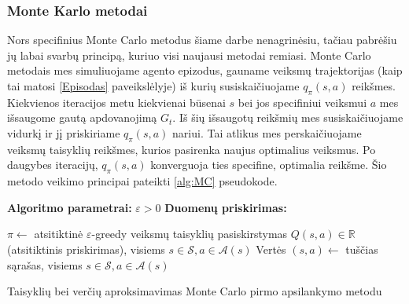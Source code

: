 \documentclass[a4paper, 12pt]{article}
\begin{document}
\clearpage
\subsubsection{Monte Karlo metodai}

Nors specifinius Monte Carlo metodus šiame darbe nenagrinėsiu, tačiau pabrėšiu jų labai svarbų principą, kuriuo visi naujausi metodai remiasi. Monte Carlo metodais mes simuliuojame agento epizodus, gauname veiksmų trajektorijas (kaip tai matosi \ref{Episodas} paveikslėlyje) iš kurių susiskaičiuojame $q_{\pi}(s, a)$ reikšmes. Kiekvienos iteracijos metu kiekvienai būsenai $s$ bei jos specifiniui veiksmui $a$ mes išsaugome gautą apdovanojimą $G_t$. Iš šių išsaugotų reikšmių mes susiskaičiuojame vidurkį ir jį priskiriame $q_{\pi}(s, a)$ nariui. Tai atlikus mes perskaičiuojame veiksmų taisyklių reikšmes, kurios pasirenka naujus optimalius veiksmus. Po daugybes iteracijų, $q_{\pi}(s, a)$ konverguoja ties specifine, optimalia reikšme. Šio metodo veikimo principai pateikti \ref{alg:MC} pseudokode.

\begin{algorithm}[H]
 \label{alg:MC}
\SetAlgoLined
\DontPrintSemicolon
\textbf{Algoritmo parametrai:}\; 
$\varepsilon>0$\;
\textbf{Duomenų priskirimas:}\;

	$\pi \leftarrow$ atsitiktinė $\varepsilon$-greedy veiksmų taisyklių pasiskirstymas\;
	$Q(s, a) \in \mathbb{R}$ (atsitiktinis priskirimas), visiems $s \in \mathcal{S}, a \in \mathcal{A}(s)$\;
	Vertės $(s, a) \leftarrow$ tuščias sąrašas, visiems $s \in \mathcal{S}, a \in \mathcal{A}(s)$\;
	


\caption{Taisyklių bei verčių aproksimavimas Monte Carlo pirmo apsilankymo metodu}
\end{algorithm}
\end{document}
